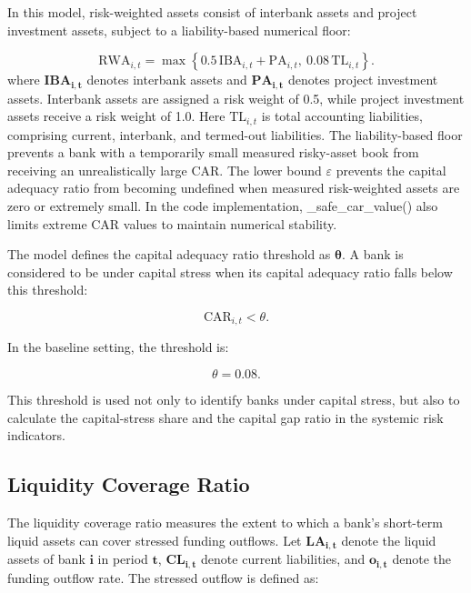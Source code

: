 In this model, risk-weighted assets consist of interbank assets and
project investment assets, subject to a liability-based numerical floor:


\begin{equation}
\mathrm{RWA}_{i,t}=\max\left\{
0.5\,\mathrm{IBA}_{i,t}+\mathrm{PA}_{i,t},
\ 0.08\,\mathrm{TL}_{i,t}
\right\}\label{eq:rwa}.
\end{equation}
\vspace{-0.4\baselineskip}
\noindent where \(\mathbf{IB}\mathbf{A}_{\mathbf{i},\mathbf{t}}\) denotes
interbank assets and \(\mathbf{P}\mathbf{A}_{\mathbf{i},\mathbf{t}}\)
denotes project investment assets. Interbank assets are assigned a risk
weight of 0.5, while project investment assets receive a risk weight of
1.0. Here \(\mathrm{TL}_{i,t}\) is total accounting liabilities, comprising
current, interbank, and termed-out liabilities. The liability-based floor
prevents a bank with a temporarily small measured risky-asset book from
receiving an unrealistically large CAR. The lower bound \(\varepsilon\) prevents the capital adequacy ratio
from becoming undefined when measured risk-weighted assets are zero or
extremely small. In the code implementation, \_safe\_car\_value() also
limits extreme CAR values to maintain numerical stability.

The model defines the capital adequacy ratio threshold as
\(\mathbf{\theta}\). A bank is considered to be under capital stress
when its capital adequacy ratio falls below this threshold:


\begin{equation}
\mathrm{CAR}_{i,t}<\theta.
\end{equation}


In the baseline setting, the threshold is:


\begin{equation}
\theta=0.08.
\end{equation}


This threshold is used not only to identify banks under capital stress,
but also to calculate the capital-stress share and the capital gap ratio
in the systemic risk indicators.

\subsection{Liquidity Coverage Ratio}

The liquidity coverage ratio measures the extent to which a bank's
short-term liquid assets can cover stressed funding outflows. Let
\(\mathbf{L}\mathbf{A}_{\mathbf{i},\mathbf{t}}\) denote the liquid
assets of bank \(\mathbf{i}\) in period \(\mathbf{t}\),
\(\mathbf{C}\mathbf{L}_{\mathbf{i},\mathbf{t}}\) denote current
liabilities, and \(\mathbf{o}_{\mathbf{i},\mathbf{t}}\) denote the
funding outflow rate. The stressed outflow is defined as:


